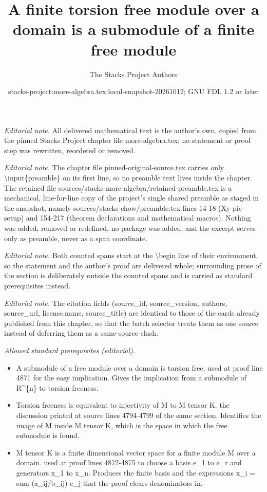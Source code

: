\documentclass[10pt,a4paper]{amsart}
\title{A finite torsion free module over a domain is a submodule of a finite free module}
\author{The Stacks Project Authors}
\date{stacks-project:more-algebra.tex:local-snapshot-20261012; GNU FDL 1.2 or later}
\theoremstyle{plain}
\theoremstyle{definition}
\theoremstyle{remark}
\numberwithin{equation}{subsection}
\begin{document}
\maketitle
\setcounter{subsection}{1}
\noindent\textit{Editorial note.} All delivered mathematical text is the author's own, copied from the pinned Stacks Project chapter file more-algebra.tex; no statement or proof step was rewritten, reordered or removed.\par\medskip
\noindent\textit{Editorial note.} The chapter file pinned-original-source.tex carries only \textbackslash{}input\{preamble\} on its first line, so no preamble text lives inside the chapter. The retained file sources/stacks-more-algebra/retained-preamble.tex is a mechanical, line-for-line copy of the project's single shared preamble as staged in the snapshot, namely sources/stacks-chow/preamble.tex lines 14-18 (Xy-pic setup) and 154-217 (theorem declarations and mathematical macros). Nothing was added, removed or redefined, no package was added, and the excerpt serves only as preamble, never as a span coordinate.\par\medskip
\noindent\textit{Editorial note.} Both counted spans start at the \textbackslash{}begin line of their environment, so the statement and the author's proof are delivered whole; surrounding prose of the section is deliberately outside the counted spans and is carried as standard prerequisites instead.\par\medskip
\noindent\textit{Editorial note.} The citation fields (source\_id, source\_version, authors, source\_url, license.name, source\_title) are identical to those of the cards already published from this chapter, so that the batch selector treats them as one source instead of deferring them as a same-source clash.\par\medskip
\noindent\textit{Allowed standard prerequisites (editorial).}\begin{itemize}
\item A submodule of a free module over a domain is torsion free. used at proof line 4871 for the easy implication. Gives the implication from a submodule of R\textasciicircum{}\{n\} to torsion freeness.
\item Torsion freeness is equivalent to injectivity of M to M tensor K. the discussion printed at source lines 4794-4799 of the same section. Identifies the image of M inside M tensor K, which is the space in which the free submodule is found.
\item M tensor K is a finite dimensional vector space for a finite module M over a domain. used at proof lines 4872-4875 to choose a basis e\_1 to e\_r and generators x\_1 to x\_n. Produces the finite basis and the expressions x\_i = sum (a\_ij/b\_ij) e\_j that the proof clears denominators in.
\end{itemize}\medskip
\end{document}
